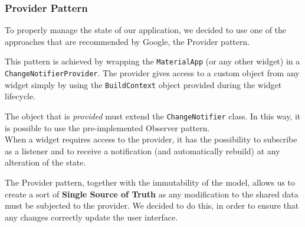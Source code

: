 \subsubsection{Provider Pattern}
To properly manage the state of our application, we decided to use one of the approaches that are recommended by Google, the Provider pattern.

This pattern is achieved by wrapping the \texttt{MaterialApp} (or any other widget) in a \texttt{ChangeNotifierProvider}.
The provider gives access to a custom object from any widget simply by using the \texttt{BuildContext} object provided during the widget lifecycle.

The object that is \emph{provided} must extend the \texttt{ChangeNotifier} class. In this way, it is possible to use the pre-implemented Observer pattern.\\
When a widget requires access to the provider, it has the possibility to subscribe as a listener and to receive a notification (and automatically rebuild) at any alteration of the state.

The Provider pattern, together with the immutability of the model, allows us to create a sort of \textbf{Single Source of Truth} as any modification to the shared data must be subjected to the provider.
We decided to do this, in order to ensure that any changes correctly update the user interface.

